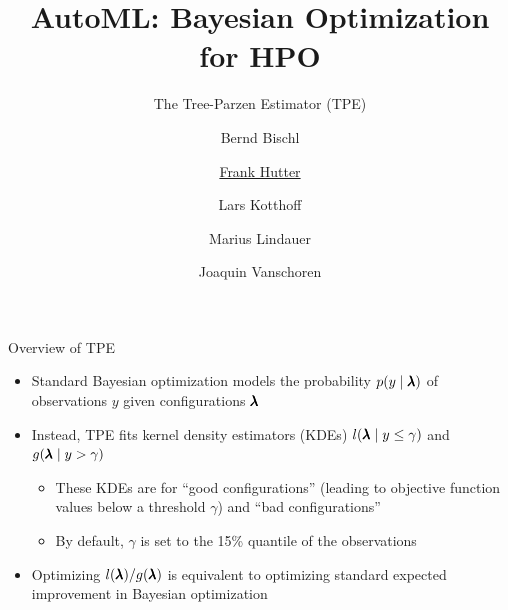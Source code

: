 


\title{AutoML: Bayesian Optimization for HPO}
\subtitle{The Tree-Parzen Estimator (TPE)}
\author[Marius Lindauer]{Bernd Bischl \and \underline{Frank Hutter} \and Lars Kotthoff\newline \and Marius Lindauer \and Joaquin Vanschoren}
\institute{}
\date{}
    
    
    

\maketitle

\begin{frame}[c]{Overview of TPE }

\begin{itemize}
    \item Standard Bayesian optimization models the probability $p(y \mid \pmb{\lambda})$ of observations $y$ given configurations $\pmb{\lambda}$
    \item Instead, \alert{TPE fits kernel density estimators (KDEs) $l(\pmb{\lambda} \mid y \le \gamma)$ and $g(\pmb{\lambda} \mid y > \gamma)$}
    \begin{itemize}
        \item These KDEs are for ``good configurations'' (leading to objective function values below a threshold $\gamma$) and ``bad configurations''
        \item By default, $\gamma$ is set to the 15\% quantile of the observations
    \end{itemize}
\medskip
\pause
    \item Optimizing $l(\pmb{\lambda})/g(\pmb{\lambda})$ is equivalent to optimizing standard expected improvement in Bayesian optimization 
    

\end{itemize}
\end{frame}
